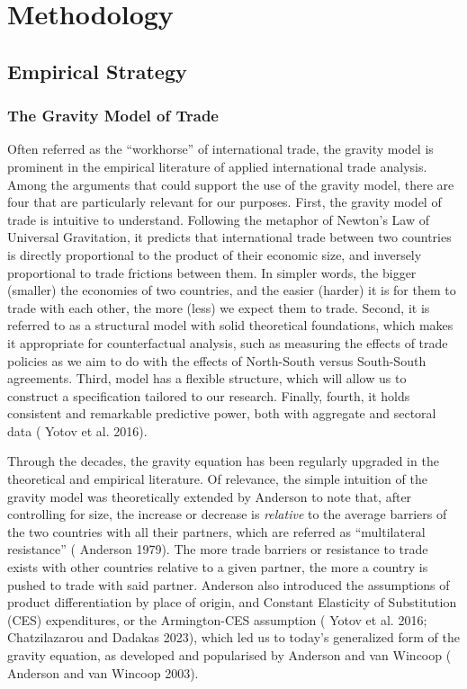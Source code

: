 \documentclass[12pt]{article}%
\begin{document}
%
\section{Methodology}%
\label{sec:Methodology}%
\subsection{Empirical Strategy}%
\label{subsec:EmpiricalStrategy}%
\subsubsection{The Gravity Model of Trade}%
\label{ssubsec:TheGravityModelofTrade}%

%
Often referred as the ``workhorse'' of international trade, the gravity
model is prominent in the empirical literature of applied international
trade analysis. Among the arguments that could support the use of the
gravity model, there are four that are particularly relevant for our
purposes. First, the gravity model of trade is intuitive to understand.
Following the metaphor of Newton's Law of Universal Gravitation, it
predicts that international trade between two countries is directly
proportional to the product of their economic size, and inversely
proportional to trade frictions between them. In simpler words, the
bigger (smaller) the economies of two countries, and the easier (harder)
it is for them to trade with each other, the more (less) we expect them
to trade. Second, it is referred to as a structural model with solid
theoretical foundations, which makes it appropriate for counterfactual
analysis, such as measuring the effects of trade policies as we aim to
do with the effects of North-South versus South-South agreements. Third,
model has a flexible structure, which will allow us to construct a
specification tailored to our research. Finally, fourth, it holds
consistent and remarkable predictive power, both with aggregate and
sectoral data (\cite{yotov_advanced_2016} Yotov et al. 2016).

Through the decades, the gravity equation has been regularly upgraded in
the theoretical and empirical literature. Of relevance, the simple
intuition of the gravity model was theoretically extended by Anderson to
note that, after controlling for size, the increase or decrease is
\emph{relative} to the average barriers of the two countries with all
their partners, which are referred as ``multilateral resistance''
(\cite{anderson_theoretical_1979} Anderson 1979). The more trade barriers or resistance to trade exists
with other countries relative to a given partner, the more a country is
pushed to trade with said partner. Anderson also introduced the
assumptions of product differentiation by place of origin, and Constant
Elasticity of Substitution (CES) expenditures, or the Armington-CES
assumption (\cite{yotov_advanced_2016} Yotov et al. 2016; \cite{chatzilazarou_trade_2023} Chatzilazarou and Dadakas 2023), which
led us to today's generalized form of the gravity equation, as developed
and popularised by Anderson and van Wincoop (\cite{anderson_gravity_2003} Anderson and van Wincoop
2003).
\end{document}
